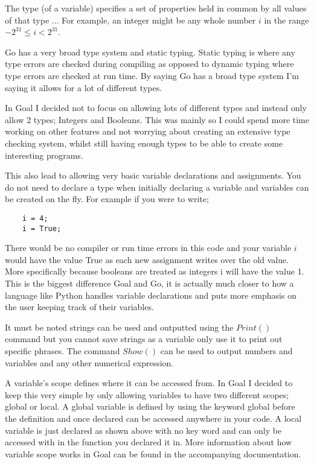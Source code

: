 \begin{displayquote}
The type (of a variable) specifies a set of properties held in common by all values of that type ... For example, an integer might be any whole number $i$ in the range $-2^{31} \leq i < 2^{31}$.
\end{displayquote}

Go has a very broad type system and static typing. Static typing is where any type errors are checked during compiling as opposed to dynamic typing where type errors are checked at run time. By saying Go has a broad type system I'm saying it allows for a lot of different types.

In Goal I decided not to focus on allowing lots of different types and instead only allow 2 types; Integers and Booleans. This was mainly so I could spend more time working on other features and not worrying about creating an extensive type checking system, whilst still having enough types to be able to create some interesting programs.

This also lead to allowing very basic variable declarations and assignments. You do not need to declare a type when initially declaring a variable and variables can be created on the fly. For example if you were to write;

\begin{lstlisting}
	i = 4;
	i = True;
\end{lstlisting}

There would be no compiler or run time errors in this code and your variable $i$ would have the value True as each new assignment writes over the old value. More specifically because booleans are treated as integers i will have the value 1.  This is the biggest difference Goal and Go, it is actually much closer to how a language like Python handles variable declarations and puts more emphasis on the user keeping track of their variables.

It must be noted strings can be used and outputted using the $Print()$ command but you cannot save strings as a variable only use it to print out specific phrases. The command $Show()$ can be used to output numbers and variables and any other numerical expression. 

A variable's scope defines where it can be accessed from. In Goal I decided to keep this very simple by only allowing variables to have two different scopes; global or local. A global variable is defined by using the keyword global before the definition and once declared can be accessed anywhere in your code. A local variable is just declared as shown above with no key word and can only be accessed with in the function you declared it in. More information about how variable scope works in Goal can be found in the accompanying documentation.     

